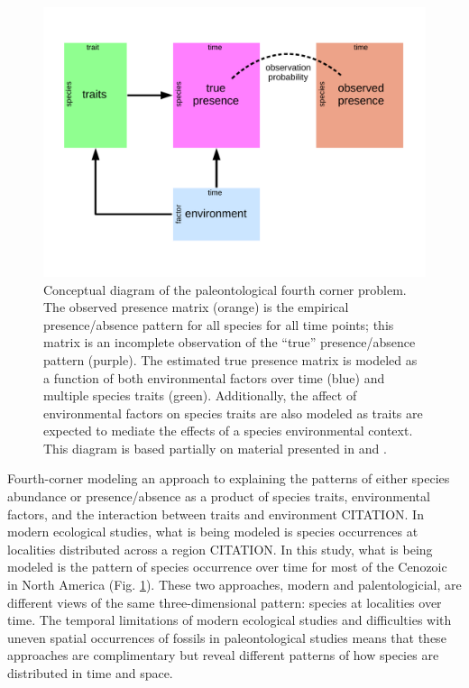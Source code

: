 \documentclass[12pt,letterpaper]{article}
\begin{document}
\begin{figure}[ht]
  \centering
  \includegraphics[width=\textwidth,height=0.8\textheight,keepaspectratio=true]{figure/paleo_fourth_corner}
  \caption[Conceptual diagram of the paleontological fourth-courner problem]{Conceptual diagram of the paleontological fourth corner problem. The observed presence matrix (orange) is the empirical presence/absence pattern for all species for all time points; this matrix is an incomplete observation of the ``true'' presence/absence pattern (purple). The estimated true presence matrix is modeled as a function of both environmental factors over time (blue) and multiple species traits (green). Additionally, the affect of environmental factors on species traits are also modeled as traits are expected to mediate the effects of a species environmental context. This diagram is based partially on material presented in \citet{Brown2014c} and \citet{Warton2015a}.}
  \label{fig:concept_fourth_corner}
\end{figure}

Fourth-corner modeling an approach to explaining the patterns of either species abundance or presence/absence as a product of species traits, environmental factors, and the interaction between traits and environment CITATION. In modern ecological studies, what is being modeled is species occurrences at localities distributed across a region CITATION. In this study, what is being modeled is the pattern of species occurrence over time for most of the Cenozoic in North America (Fig. \ref{fig:concept_fourth_corner}). These two approaches, modern and palentologicial, are different views of the same three-dimensional pattern: species at localities over time. The temporal limitations of modern ecological studies and difficulties with uneven spatial occurrences of fossils in paleontological studies means that these approaches are complimentary but reveal different patterns of how species are distributed in time and space.
\end{document}
